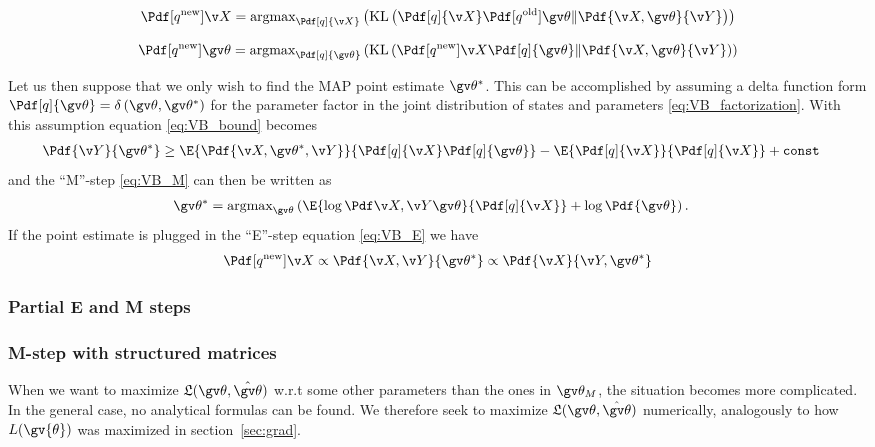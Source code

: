 \begin{description}
\addtolength{\leftskip}{1cm}
\item[E-step]
\begin{align}
	\Pdf[q^{\text{new}}]{\X}=\text{argmax}_{\Pdf[q]{\X}}\left(\KL{\Pdf[q]{\X}\Pdf[q^{\text{old}}]{\Th}}{\Pdf{\X,\Th}{\Y}}\right)
	\label{eq:VB_E}
\end{align}
\item[M-step]
\begin{align}
	\Pdf[q^{\text{new}}]{\Th}=\text{argmax}_{\Pdf[q]{\Th}}\left(\KL{\Pdf[q^{\text{new}}]{\X}\Pdf[q]{\Th}}{\Pdf{\X,\Th}{\Y}}\right)
	\label{eq:VB_M}
\end{align}
\end{description}


Let us then suppose that we only wish to find the MAP point estimate $\Th^*$. This can be accomplished
by assuming a delta function form $\Pdf[q]{\Th}=\delta\left(\Th,\Th^*\right)$ for the parameter factor in the
joint distribution of states and parameters \eqref{eq:VB_factorization}.
With this assumption equation \eqref{eq:VB_bound} becomes
\begin{align}
	\Pdf{\Y}{\Th^*} &\geq \E{\Pdf{\X,\Th^*,\Y}}{\Pdf[q]{\X}\Pdf[q]{\Th}} - \E{\Pdf[q]{\X}}{\Pdf[q]{\X}} + \mathtt{const}
	\label{eq:VB_MAP_boundl}
\end{align}
and the ``M''-step \eqref{eq:VB_M} can then be written as
\begin{align}
	\Th^* &= \text{argmax}_{\Th}\left(\E{\lcLH}{\Pdf[q]{\X}}+\log\Pdf{\Th}\right).
	\label{tablelabel}
\end{align}
If the point estimate is plugged in the ``E''-step equation \eqref{eq:VB_E} we have
\begin{align}
	\Pdf[q^{\text{new}}]{\X}\propto \Pdf{\X,\Y}{\Th^*} \propto \Pdf{\X}{\Y,\Th^*} 
	\label{tablelabel}
\end{align}

\subsubsection{Partial E and M steps}




\subsubsection{M-step with structured matrices}
\cite{Wills2011}
When we want to maximize $\Lb(\Th,\hat{\Th})$ w.r.t some other
parameters than the ones in $\Th_M$, the situation becomes more complicated.
In the general case, no analytical formulas can be found. We therefore seek
to maximize $\Lb(\Th,\hat{\Th})$ numerically, analogously to how $L(\gv{\theta})$
was maximized in section~\ref{sec:grad}.

